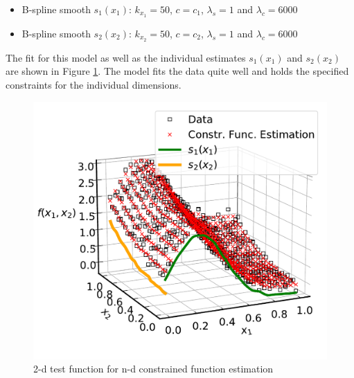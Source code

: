 \documentclass[10pt,a4paper]{article}
\begin{document}
	\begin{itemize}
		\item B-spline smooth $s_1(x_1)$: $k_{x_1} = 50$, $c = c_1$, $\lambda_s = 1$ and $\lambda_c = 6000$
		\item B-spline smooth $s_2(x_2)$: $k_{x_2} = 50$, $c = c_2$, $\lambda_s = 1$ and $\lambda_c = 6000$
	\end{itemize}
		
	The fit for this model as well as the individual estimates $s_1(x_1)$ and $s_2(x_2)$ are shown in Figure \ref{fig:2d_example}. The model fits the data quite well and holds the specified constraints for the individual dimensions.
		
	\begin{figure}[H]
	\centering
	\includegraphics[width=\linewidth]{../thesisplots/2d_example.pdf}
	\caption{2-d test function for n-d constrained function estimation}
	\label{fig:2d_example}
	\end{figure}


	
\printbibliography
	
\end{document}
